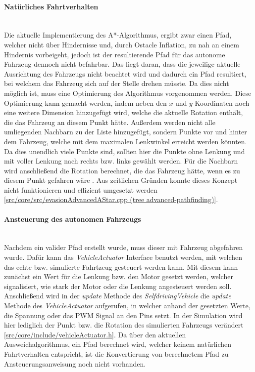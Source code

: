 \paragraph{Natürliches Fahrtverhalten} \mbox{}\\

Die aktuelle Implementierung des A*-Algorithmus, ergibt zwar einen Pfad, welcher nicht über Hindernisse und, durch Ostacle Inflation, 
zu nah an einem Hindernis vorbeigeht, jedoch ist der resultierende Pfad für das autonome Fahrzeug dennoch nicht befahrbar. 
Das liegt daran, dass die jeweilige aktuelle Ausrichtung des Fahrzeugs nicht beachtet wird und dadurch ein Pfad resultiert, 
bei welchem das Fahrzeug sich auf der Stelle drehen müsste. 
Da dies nicht möglich ist, muss eine Optimierung des Algorithmus vorgenommen werden. 
Diese Optimierung kann gemacht werden, indem neben den \(x\) und \(y\) Koordinaten noch eine weitere Dimension hinzugefügt wird, 
welche die aktuelle Rotation enthält, die das Fahrzeug an diesem Punkt hätte. 
Außerdem werden nicht alle umliegenden Nachbarn zu der Liste hinzugefügt, sondern Punkte vor und hinter dem Fahrzeug, 
welche mit dem maximalen Lenkwinkel erreicht werden könnten. Da dies unendlich viele Punkte sind, 
sollten hier die Punkte ohne Lenkung und mit voller Lenkung nach rechts bzw. links gewählt werden. 
Für die Nachbarn wird anschließend die Rotation berechnet, die das Fahrzeug hätte, 
wenn es zu diesem Punkt gefahren wäre \cite{restricted_pathfindng_2017}. 
Aus zeitlichen Gründen konnte dieses Konzept nicht funktionieren und effizient umgesetzt werden 
[\href{https://github.com/Jundy0/Studienarbeit/blob/advanced-pathfinding/src/core/src/evasionAdvancedAStar.cpp}{src/core/src/evasionAdvancedAStar.cpp (tree advanced-pathfinding)}]. 

\paragraph{Ansteuerung des autonomen Fahrzeugs} \mbox{}\\

Nachdem ein valider Pfad erstellt wurde, muss dieser mit Fahrzeug abgefahren wurde. 
Dafür kann das \textit{VehicleActuator} Interface benutzt werden, mit welchen das echte bzw. simulierte Fahrtzeug gesteuert werden kann. 
Mit diesem kann zunächst ein Wert für die Lenkung bzw. den Motor gesetzt werden, welcher signalisiert, 
wie stark der Motor oder die Lenkung angesteuert werden soll. 
Anschließend wird in der \textit{update} Methode des \textit{SelfdrivingVehicle} die \textit{update} Methode des \textit{VehicleActuator} aufgerufen, 
in welcher anhand der gesetzten Werte, die Spannung oder das PWM Signal an den Pins setzt. 
In der Simulation wird hier lediglich der Punkt bzw. die Rotation des simulierten Fahrzeugs verändert 
[\href{https://github.com/Jundy0/Studienarbeit/blob/main/src/core/include/vehicleActuator.h}{src/core/include/vehicleActuator.h}]. 
Da über den aktuellen Ausweichalgorithmus, ein Pfad berechnet wird, welcher keinem natürlichen Fahrtverhalten entspricht, 
ist die Konvertierung von berechnetem Pfad zu Ansteuerungsanweisung noch nicht vorhanden. 

\newpage
